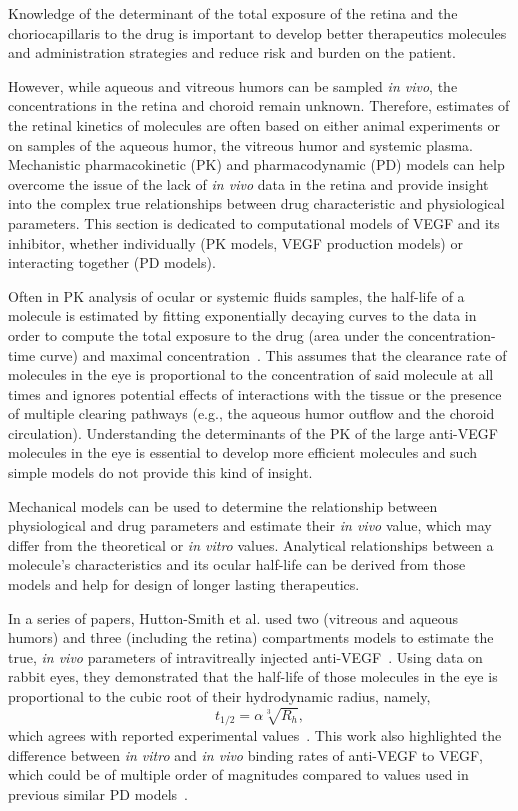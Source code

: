 \documentclass[12pt,a4paper]{journal}
\begin{document}
Knowledge of the determinant of the total exposure of the retina and the choriocapillaris to the drug is important to develop better therapeutics molecules and administration strategies and reduce risk and burden on the patient.

However, while aqueous and vitreous humors can be sampled \textit{in vivo}, the concentrations in the retina and choroid remain unknown. 
Therefore, estimates of the retinal kinetics of molecules are often based on either animal experiments or on samples of the aqueous humor, the vitreous humor and systemic plasma.
Mechanistic pharmacokinetic (PK) and pharmacodynamic (PD) models can help overcome the issue of the lack of \textit{in vivo} data in the retina and provide insight into the complex true relationships between drug characteristic and physiological parameters.
This section is dedicated to computational models of VEGF and its inhibitor, whether individually (PK models, VEGF production models) or interacting together (PD models).

Often in PK analysis of ocular or systemic fluids samples, the half-life of a molecule is estimated by fitting exponentially decaying curves to the data in order to compute the total exposure to the drug (area under the concentration-time curve) and maximal concentration~\cite{Bakri_2007, Kaiser_2019, Park_2015, Park_2016, Xu_2013}.
This assumes that the clearance rate of molecules in the eye is proportional to the concentration of said molecule at all times and ignores potential effects of interactions with the tissue or the presence of multiple clearing pathways (e.g., the aqueous humor outflow and the choroid circulation).
Understanding the determinants of the PK of the large anti-VEGF molecules in the eye is essential to develop more efficient molecules and such simple models do not provide this kind of insight.

Mechanical models can be used to determine the relationship between physiological and drug parameters and estimate their \textit{in vivo} value, which may differ from the theoretical or \textit{in vitro} values.
Analytical relationships between a molecule's characteristics and its ocular half-life can be derived from those models and help for design of longer lasting therapeutics.

In a series of papers, Hutton-Smith et al. used two (vitreous and aqueous humors) and three (including the retina) compartments models to estimate the true, \textit{in vivo} parameters of intravitreally injected anti-VEGF~\cite{HuttonSmith_2016,HuttonSmith_2017,HuttonSmith_2018}.
Using data on rabbit eyes, they demonstrated that the half-life of those molecules in the eye is proportional to the cubic root of their hydrodynamic radius, namely,
\begin{equation}
  \label{eq:t12_Hutton-Smith}
  t_{1/2} = \alpha\sqrt[3]{R_h},
\end{equation}
which agrees with reported experimental values~\cite{HuttonSmith_2016}.
This work also highlighted the difference between \textit{in vitro} and \textit{in vivo} binding rates of anti-VEGF to VEGF, which could be of multiple order of magnitudes compared to values used in previous similar PD models~\cite{Saunders_2015}.
\end{document}
